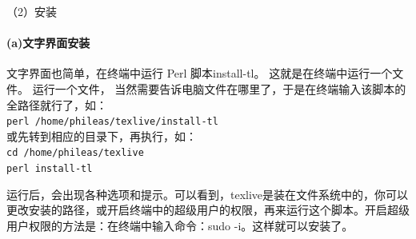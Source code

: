 （2）安装
\paragraph{(a)文字界面安装}
文字界面也简单，在终端中运行 Perl 脚本install-tl。 这就是在终端中运行一个文件。 运行一个文件， 当然需要告诉电脑文件在哪里了，于是在终端输入该脚本的全路径就行了，如：\\
\verb*|perl /home/phileas/texlive/install-tl|\\
或先转到相应的目录下，再执行，如：\\
\verb*|cd /home/phileas/texlive|\\
\verb*|perl install-tl|

运行后，会出现各种选项和提示。可以看到，texlive是装在文件系统中的，你可以更改安装的路径，或开启终端中的超级用户的权限，再来运行这个脚本。开启超级用户权限的方法是：在终端中输入命令：sudo -i。这样就可以安装了。

